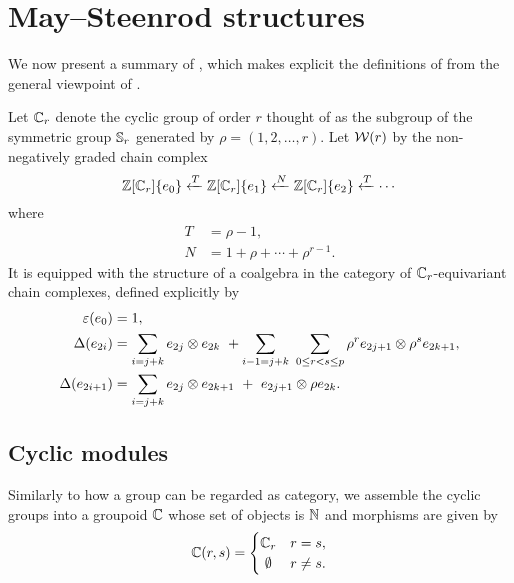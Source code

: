 
\section{May--Steenrod structures}

We now present a summary of \cite{medina2021may_st}, which makes explicit the definitions of \cite{steenrod1953cyclic} from the general viewpoint of \cite{may1970general}.

Let $\mathbb{C}_r$ denote the cyclic group of order $r$ thought of as the subgroup of the symmetric group $\mathbb{S}_r$ generated by $\rho = (1,2,\dots,r)$.
Let $\mathcal{W}(r)$ by the non-negatively graded chain complex
\begin{equation}\label{eq: minimal resolution}
	\mathbb{Z}[\mathbb{C}_r]\{e_0\} \xleftarrow{T} \mathbb{Z}[\mathbb{C}_r]\{e_1\} \xleftarrow{N} \mathbb{Z}[\mathbb{C}_r]\{e_2\} \xleftarrow{T} \cdots
\end{equation}
where
\begin{equation} \label{eq: T and R definition}
	\begin{split}
		T &= \rho - 1, \\
		N &= 1 + \rho + \cdots + \rho^{r-1}.
	\end{split}
\end{equation}
It is equipped with the structure of a coalgebra in the category of $\mathbb{C}_r$-equivariant chain complexes, defined explicitly by
\begin{align*}
	\varepsilon(e_0) &= 1, \\
	\Delta(e_{2i}) &=
	\sum_{i=j+k} e_{2j} \otimes e_{2k} \ + \sum_{i-1=j+k} \ \sum_{0 \leq r < s \leq p} \rho^r e_{2j+1} \otimes \rho^s e_{2k+1}, \\
	\Delta(e_{2i+1}) &=
	\sum_{i=j+k} e_{2j} \otimes e_{2k+1} \ +\ e_{2j+1} \otimes \rho e_{2k}.
\end{align*}


\subsection{Cyclic modules}

Similarly to how a group can be regarded as category, we assemble the cyclic groups into a groupoid $\mathbb{C}$ whose set of objects is $\mathbb{N}$ and morphisms are given by
\[
\cyc(r,s) =
\begin{cases}
	\cyc_r & r = s, \\
	\hfil \emptyset & r \neq s.
\end{cases}
\]

